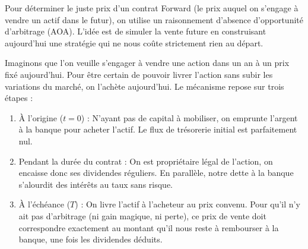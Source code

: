 \begin{intuitionbox}
Pour déterminer le juste prix d'un contrat Forward (le prix auquel on s'engage à vendre un actif dans le futur), on utilise un raisonnement d'absence d'opportunité d'arbitrage (AOA). L'idée est de simuler la vente future en construisant aujourd'hui une stratégie qui ne nous coûte strictement rien au départ. 

Imaginons que l'on veuille s'engager à vendre une action dans un an à un prix fixé aujourd'hui. Pour être certain de pouvoir livrer l'action sans subir les variations du marché, on l'achète aujourd'hui. Le mécanisme repose sur trois étapes :
\begin{enumerate}
    \item À l'origine ($t=0$) : N'ayant pas de capital à mobiliser, on emprunte l'argent à la banque pour acheter l'actif. Le flux de trésorerie initial est parfaitement nul.
    \item Pendant la durée du contrat : On est propriétaire légal de l'action, on encaisse donc ses dividendes réguliers. En parallèle, notre dette à la banque s'alourdit des intérêts au taux sans risque.
    \item À l'échéance ($T$) : On livre l'actif à l'acheteur au prix convenu. Pour qu'il n'y ait pas d'arbitrage (ni gain magique, ni perte), ce prix de vente doit correspondre exactement au montant qu'il nous reste à rembourser à la banque, une fois les dividendes déduits. 
\end{enumerate}
\end{intuitionbox}

